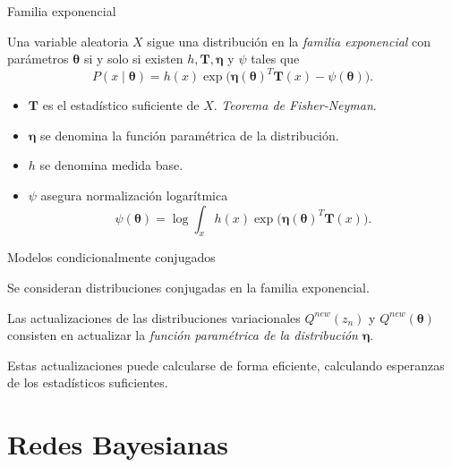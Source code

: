 \documentclass[aspectratio=169]{beamer}
\newcommand{\btheta}{\bm{\theta}}
\begin{document}
  \begin{frame}{Familia exponencial}
    \begin{shaded}
      Una variable aleatoria \(X\) sigue una distribución en la \emph{familia exponencial} con parámetros \(\btheta\) si y solo si existen \(h, \bm{T}, \bm{\eta}\) y \(\psi\) tales que
      \[
        P(x \mid \btheta) = h(x) \exp \Big( \bm{\eta}(\btheta)^{T}\bm{T}(x) - \psi(\btheta)\Big).
      \]
    \end{shaded}
    \begin{itemize}
      \item \(\bm{T}\) es el estadístico suficiente de \(X\). \emph{Teorema de Fisher-Neyman}.
      \item \(\bm{\eta}\) se denomina la función paramétrica de la distribución.
      \item \(h\) se denomina medida base.
      \item \(\psi\) asegura normalización logarítmica
        \[
        \psi(\btheta) = \log \int_{x} h(x)\exp \Big( \bm{\eta}(\btheta)^{T}\bm{T}(x) \Big).
        \]
    \end{itemize}
  \end{frame}

  \begin{frame}{Modelos condicionalmente conjugados}

    Se consideran distribuciones conjugadas en la familia exponencial.

    Las actualizaciones de las distribuciones variacionales \(Q^{new}(z_{n})\) y \(Q^{new}(\btheta)\) consisten en actualizar la \emph{función paramétrica de la distribución} \(\bm{\eta}\).

    Estas actualizaciones puede calcularse de forma eficiente, calculando esperanzas de los estadísticos suficientes.

  \end{frame}

  \section{Redes Bayesianas}
\end{document}
